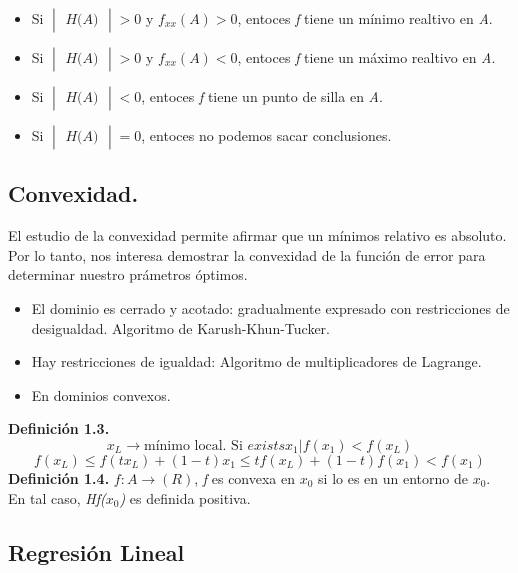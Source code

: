 \documentclass[a4paper,10pt]{article}
\begin{document}
\begin{itemize}
    \item Si $\begin{vmatrix}\textit{H(A)}\end{vmatrix}>0$ y $ f_{xx}(A)>0$, entoces \textit{f} tiene un mínimo realtivo en \textit{A}.
    \item Si $\begin{vmatrix}\textit{H(A)}\end{vmatrix}>0$ y $ f_{xx}(A)<0$, entoces \textit{f} tiene un máximo realtivo en \textit{A}.
    \item Si $\begin{vmatrix}\textit{H(A)}\end{vmatrix}<0$, entoces \textit{f} tiene un punto de silla en \textit{A}.
    \item Si $\begin{vmatrix}\textit{H(A)}\end{vmatrix}=0$, entoces no podemos sacar conclusiones.
\end{itemize}


\subsection{Convexidad.}

El estudio de la convexidad permite afirmar que un mínimos relativo es absoluto. Por lo tanto, nos interesa demostrar la convexidad de la función de error para determinar nuestro prámetros óptimos.

\begin{itemize}
\item El dominio es cerrado y acotado: gradualmente expresado con restricciones de desigualdad. Algoritmo de Karush-Khun-Tucker.
\item Hay restricciones de igualdad: Algoritmo de multiplicadores de Lagrange.
\item En dominios convexos.
\end{itemize}
\textbf{Definición 1.3.} 
\[x_{L} \rightarrow \text{mínimo local. Si } exists x_{1} |  f(x_{1}) < f(x_{L})\]
\[f(x_{L})\leq f(tx_{L})+(1-t)x_{1}\leq tf(x_{L})+(1-t)f(x_{1})<f(x_{1})\]
\textbf{Definición 1.4.}
$\textit{f}: \textit{A}\rightarrow (R)$, \textit{f} es convexa en $x_{0}$ si lo es en un entorno de $x_{0}$. En tal caso, \textit{Hf($x_{0}$)} es definida positiva.
\subsection{Regresión Lineal}
\end{document}
